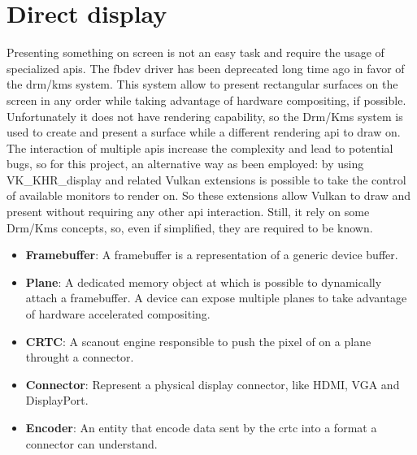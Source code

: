 \section{Direct display}
Presenting something on screen is not an easy task and require the usage of specialized apis. The fbdev driver has been deprecated long time ago in favor of the drm/kms system. This system allow to present rectangular surfaces on the screen in any order while taking advantage of hardware compositing, if possible. Unfortunately it does not have rendering capability, so the Drm/Kms system is used to create and present a surface while a different rendering api to draw on. The interaction of multiple apis increase the complexity and lead to potential bugs, so for this project, an alternative way as been employed: by using VK\_KHR\_display and related Vulkan extensions is possible to take the control of available monitors to render on. So these extensions allow Vulkan to draw and present without requiring any other api interaction. Still, it rely on some Drm/Kms concepts, so, even if simplified, they are required to be known.
\begin{itemize}
	\item \textbf{Framebuffer}: A framebuffer is a representation of a generic device buffer.
	\item \textbf{Plane}: A dedicated memory object at which is possible to dynamically attach a framebuffer. A device can expose multiple planes to take advantage of hardware accelerated compositing.
	\item \textbf{CRTC}: A scanout engine responsible to push the pixel of on a plane throught a connector.
	\item \textbf{Connector}: Represent a physical display connector, like HDMI, VGA and DisplayPort.
	\item \textbf{Encoder}: An entity that encode data sent by the crtc into a format a connector can understand.
\end{itemize}


